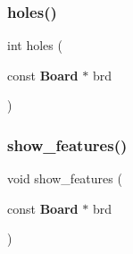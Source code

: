 \mbox{\label{tools_8h_af5aed4274764b48658e2572c7f5fcd8c}} 
\subsubsection{holes()}
{\footnotesize\ttfamily int holes (\begin{DoxyParamCaption}\item[{const \textbf{ Board} $\ast$}]{brd }\end{DoxyParamCaption})}

\mbox{\label{tools_8h_a453fbdbb55f005553eadfe4e955a6183}} 
\subsubsection{show\+\_\+features()}
{\footnotesize\ttfamily void show\+\_\+features (\begin{DoxyParamCaption}\item[{const \textbf{ Board} $\ast$}]{brd }\end{DoxyParamCaption})}

